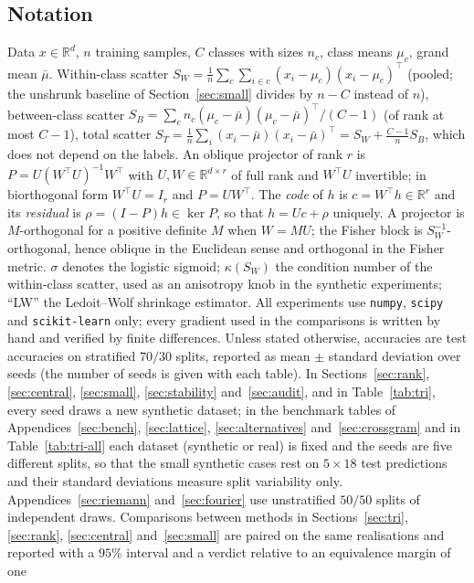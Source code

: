 \documentclass[11pt,a4paper]{article}
\theoremstyle{plain}
\theoremstyle{definition}
\theoremstyle{remark}
\newcommand{\R}{\mathbb R}
\newcommand{\T}{\top}
\begin{document}
\subsection{Notation}
Data $x\in\R^d$, $n$ training samples, $C$ classes with sizes $n_c$, class
means $\mu_c$, grand mean $\bar\mu$. Within-class scatter
$S_W=\tfrac1n\sum_c\sum_{i\in c}(x_i-\mu_c)(x_i-\mu_c)^\T$ (pooled; the
unshrunk baseline of Section~\ref{sec:small} divides by $n-C$ instead of
$n$), between-class scatter
$S_B=\sum_c n_c(\mu_c-\bar\mu)(\mu_c-\bar\mu)^\T/(C-1)$ (of rank at most
$C-1$), total scatter
$S_T=\tfrac1n\sum_i(x_i-\bar\mu)(x_i-\bar\mu)^\T=S_W+\tfrac{C-1}{n}S_B$,
which does not depend on the labels. An oblique projector of
rank $r$ is $P=U(W^\T U)^{-1}W^\T$ with $U,W\in\R^{d\times r}$ of full rank
and $W^\T U$ invertible; in biorthogonal form $W^\T U=I_r$ and $P=UW^\T$.
The \emph{code} of $h$ is $c=W^\T h\in\R^r$ and its \emph{residual} is
$\rho=(I-P)h\in\ker P$, so that $h=Uc+\rho$ uniquely. A projector is
$M$-orthogonal for a positive definite $M$ when $W=MU$; the Fisher block is
$S_W^{-1}$-orthogonal, hence oblique in the Euclidean sense and orthogonal in
the Fisher metric. $\sigma$ denotes the logistic sigmoid; $\kappa(S_W)$ the
condition number of the within-class scatter, used as an anisotropy knob in
the synthetic experiments; ``LW'' the Ledoit--Wolf shrinkage estimator. All
experiments use \texttt{numpy}, \texttt{scipy} and \texttt{scikit-learn}
only; every gradient used in the comparisons is written by hand and verified
by finite differences. Unless stated otherwise, accuracies are test accuracies
on stratified $70/30$ splits, reported as mean $\pm$ standard deviation over
seeds (the number of seeds is given with each table). In
Sections~\ref{sec:rank}, \ref{sec:central}, \ref{sec:small},
\ref{sec:stability} and~\ref{sec:audit}, and in Table~\ref{tab:tri}, every
seed draws a new synthetic dataset; in the benchmark tables of
Appendices~\ref{sec:bench}, \ref{sec:lattice}, \ref{sec:alternatives}
and~\ref{sec:crossgram} and in Table~\ref{tab:tri-all} each dataset
(synthetic or real) is fixed and the seeds are five different splits, so
that the small synthetic cases rest on $5\times18$ test predictions and
their standard deviations measure split variability only.
Appendices~\ref{sec:riemann} and~\ref{sec:fourier} use unstratified $50/50$
splits of independent draws. Comparisons between methods in
Sections~\ref{sec:tri}, \ref{sec:rank}, \ref{sec:central}
and~\ref{sec:small} are paired on the same realisations and reported with a
$95\%$ interval and a verdict relative to an equivalence margin of one
\end{document}
